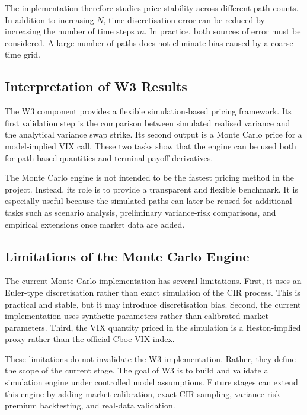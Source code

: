 The implementation therefore studies price stability across different path counts. In addition to increasing \(N\), time-discretisation error can be reduced by increasing the number of time steps \(m\). In practice, both sources of error must be considered. A large number of paths does not eliminate bias caused by a coarse time grid.

\subsection{Interpretation of W3 Results}

The W3 component provides a flexible simulation-based pricing framework. Its first validation step is the comparison between simulated realised variance and the analytical variance swap strike. Its second output is a Monte Carlo price for a model-implied VIX call. These two tasks show that the engine can be used both for path-based quantities and terminal-payoff derivatives.

The Monte Carlo engine is not intended to be the fastest pricing method in the project. Instead, its role is to provide a transparent and flexible benchmark. It is especially useful because the simulated paths can later be reused for additional tasks such as scenario analysis, preliminary variance-risk comparisons, and empirical extensions once market data are added.

\subsection{Limitations of the Monte Carlo Engine}

The current Monte Carlo implementation has several limitations. First, it uses an Euler-type discretisation rather than exact simulation of the CIR process. This is practical and stable, but it may introduce discretisation bias. Second, the current implementation uses synthetic parameters rather than calibrated market parameters. Third, the VIX quantity priced in the simulation is a Heston-implied proxy rather than the official Cboe VIX index.

These limitations do not invalidate the W3 implementation. Rather, they define the scope of the current stage. The goal of W3 is to build and validate a simulation engine under controlled model assumptions. Future stages can extend this engine by adding market calibration, exact CIR sampling, variance risk premium backtesting, and real-data validation.